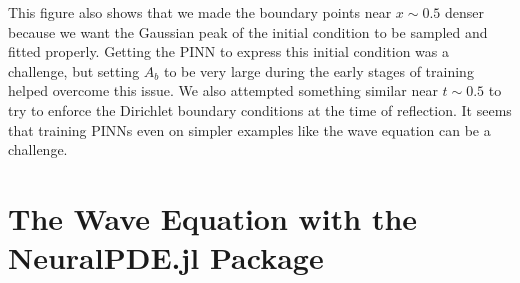 \documentclass[11pt]{article}
\newcommand{\1}{\mathbf 1}
\begin{document}
This figure also shows that we made the boundary points near $x \sim 0.5$ denser because we want the Gaussian peak of the initial condition to be sampled and fitted properly.
Getting the PINN to express this initial condition was a challenge, but setting $A_b$ to be very large during the early stages of training helped overcome this issue.
We also attempted something similar near $t \sim 0.5$ to try to enforce the Dirichlet boundary conditions at the time of reflection.
It seems that training PINNs even on simpler examples like the wave equation can be a challenge.



\section{The Wave Equation with the NeuralPDE.jl Package}
\end{document}
